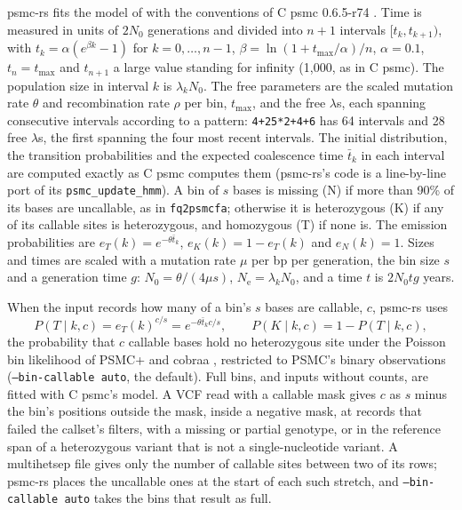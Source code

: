 \documentclass[11pt]{article}
\newcommand{\psmcrs}{psmc-rs}
\newcommand{\Ne}{\ensuremath{N_\mathrm{e}}}
\newcommand{\opt}[1]{\texttt{#1}}
\begin{document}
\psmcrs{} fits the model of \citet{li2011} with the conventions of C psmc 0.6.5-r74 \citep{psmcC}. Time is measured in units of $2N_0$ generations and divided into $n+1$ intervals $[t_k,t_{k+1})$, with $t_k=\alpha(e^{\beta k}-1)$ for $k=0,\dots,n-1$, $\beta=\ln(1+t_{\max}/\alpha)/n$, $\alpha=0.1$, $t_n=t_{\max}$ and $t_{n+1}$ a large value standing for infinity (1,000, as in C psmc). The population size in interval $k$ is $\lambda_kN_0$. The free parameters are the scaled mutation rate $\theta$ and recombination rate $\rho$ per bin, $t_{\max}$, and the free $\lambda$s, each spanning consecutive intervals according to a pattern: \opt{4+25*2+4+6} has 64 intervals and 28 free $\lambda$s, the first spanning the four most recent intervals. The initial distribution, the transition probabilities and the expected coalescence time $\bar t_k$ in each interval are computed exactly as C psmc computes them (\psmcrs{}'s code is a line-by-line port of its \texttt{psmc\_update\_hmm}). A bin of $s$ bases is missing (N) if more than 90\% of its bases are uncallable, as in \texttt{fq2psmcfa}; otherwise it is heterozygous (K) if any of its callable sites is heterozygous, and homozygous (T) if none is. The emission probabilities are $e_T(k)=e^{-\theta\bar t_k}$, $e_K(k)=1-e_T(k)$ and $e_N(k)=1$. Sizes and times are scaled with a mutation rate $\mu$ per bp per generation, the bin size $s$ and a generation time $g$: $N_0=\theta/(4\mu s)$, $\Ne=\lambda_kN_0$, and a time $t$ is $2N_0tg$ years.

When the input records how many of a bin's $s$ bases are callable, $c$, \psmcrs{} uses
\begin{equation}
P(T\mid k,c)=e_T(k)^{c/s}=e^{-\theta\bar t_k c/s},\qquad P(K\mid k,c)=1-P(T\mid k,c),
\end{equation}
the probability that $c$ callable bases hold no heterozygous site under the Poisson bin likelihood of PSMC+ and cobraa \citep{cousins2024,cousins2025}, restricted to PSMC's binary observations (\opt{--bin-callable auto}, the default). Full bins, and inputs without counts, are fitted with C psmc's model. A VCF read with a callable mask gives $c$ as $s$ minus the bin's positions outside the mask, inside a negative mask, at records that failed the callset's filters, with a missing or partial genotype, or in the reference span of a heterozygous variant that is not a single-nucleotide variant. A multihetsep file gives only the number of callable sites between two of its rows; \psmcrs{} places the uncallable ones at the start of each such stretch, and \opt{--bin-callable auto} takes the bins that result as full.
\end{document}
